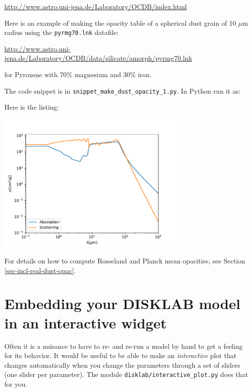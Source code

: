 \documentclass{book}
\newcommand{\code}[1]{{\small\tt #1}}
\begin{document}
\url{http://www.astro.uni-jena.de/Laboratory/OCDB/index.html}

Here is an example of making the opacity table of a spherical dust grain of 10
$\mu\mathrm{m}$ radius using the \code{pyrmg70.lnk} datafile:

\url{http://www.astro.uni-jena.de/Laboratory/OCDB/data/silicate/amorph/pyrmg70.lnk}

for Pyroxene with 70\% magnesium and 30\% iron.

The code snippet is
in \code{snippet\_make\_dust\_opacity\_1.py}. In Python run it as:
\begin{codebox}
\end{codebox}
Here is the listing:

\centerline{\includegraphics[width=0.7\textwidth]{../snippets/fig_snippet_make_dust_opacity_1_1.pdf}}

For details on how to compute Rosseland and Planck mean opacities,
see Section \ref{sec-incl-real-dust-opac}.

\chapter{Embedding your {\sf DISKLAB} model in an interactive widget}
Often it is a nuisance to have to re- and re-run a model by hand to
get a feeling for its behavior. It would be useful to be able to make
an {\em interactive} plot that changes automatically when you change
the parameters through a set of sliders (one slider per parameter).
The module \code{disklab/interactive\_plot.py} does that for you.
\end{document}
